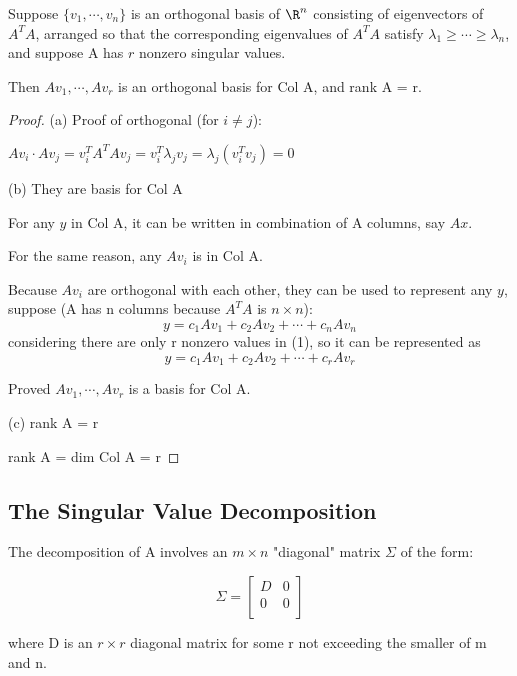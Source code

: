 \begin{theorem}
    Suppose \(\{ v_1, \cdots, v_n \} \) is an orthogonal basis of \(\R^n\) consisting of eigenvectors of \(A^TA\), arranged so that the corresponding eigenvalues of \(A^TA\) satisfy \(\lambda_1 \geq \cdots \geq \lambda_n\), and suppose A has \(r\)  nonzero singular values.   

    Then \(Av_1, \cdots, Av_r\) is an orthogonal basis for Col A, and rank A = r.
\end{theorem}
\begin{proof}
    (a) Proof of orthogonal (for \(i \neq j\)):

    \(Av_i \cdot Av_j = v_i^T A^TA v_j = v_i^T \lambda_j v_j = \lambda_j (v_i^T v_j) = 0\) 

    (b) They are basis for Col A

    For any \(y\) in Col A, it can be written in combination of A columns, say \(Ax\). 

    For the same reason, any \(Av_i\) is in Col A. 

    Because \(Av_i\) are orthogonal with each other, they can be used to represent any \(y\), suppose (A has n columns because \(A^TA\) is \(n \times n\)):
    \[
        y = c_1 Av_1 + c_2 Av_2 + \cdots + c_n Av_n \tag{1}
    \]  
    considering there are only r nonzero values in (1), so it can be represented as
    \[
        y = c_1 Av_1 + c_2 Av_2 + \cdots + c_r Av_r \tag{2}
    \]

    Proved \(Av_1, \cdots, Av_r\) is a basis for Col A. 

    (c) rank A = r 

    rank A = dim Col A = r
\end{proof}

\subsection{The Singular Value Decomposition}

The decomposition of A involves an \(m \times n \)  "diagonal" matrix \(\Sigma\) of the form:

\[
    \Sigma = \begin{bmatrix}
        D &  0 \\
        0 &  0 \\
    \end{bmatrix} \tag{3}
\]

where D is an \(r \times r\) diagonal matrix for some r not exceeding the smaller of m and n.

